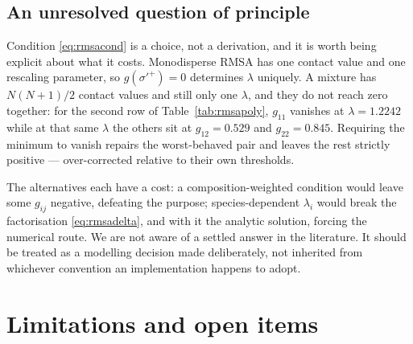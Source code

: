 \documentclass[11pt,a4paper]{article}
\begin{document}
\subsection{An unresolved question of principle}

Condition \eqref{eq:rmsacond} is a choice, not a derivation, and it is worth
being explicit about what it costs. Monodisperse RMSA has one contact value
and one rescaling parameter, so $g(\sigma'^+)=0$ determines $\lambda$ uniquely.
A mixture has $N(N{+}1)/2$ contact values and still only one $\lambda$, and
they do not reach zero together: for the second row of
Table~\ref{tab:rmsapoly}, $g_{11}$ vanishes at $\lambda=1.2242$ while at that
same $\lambda$ the others sit at $g_{12}=0.529$ and $g_{22}=0.845$. Requiring
the minimum to vanish repairs the worst-behaved pair and leaves the rest
strictly positive --- over-corrected relative to their own thresholds.

The alternatives each have a cost: a composition-weighted condition would
leave some $g_{ij}$ negative, defeating the purpose; species-dependent
$\lambda_i$ would break the factorisation \eqref{eq:rmsadelta}, and with it the
analytic solution, forcing the numerical route. We are not aware of a settled
answer in the literature. It should be treated as a modelling decision made
deliberately, not inherited from whichever convention an implementation
happens to adopt.

\section{Limitations and open items}
\label{sec:open}
\end{document}
